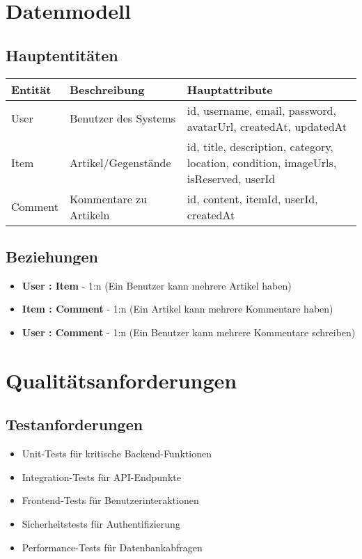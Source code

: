 \documentclass[a4paper,12pt]{article}
\begin{document}
\section{Datenmodell}

\subsection{Hauptentitäten}
\begin{longtable}{|p{}|p{}|p{}|}
\hline
\textbf{Entität} & \textbf{Beschreibung} & \textbf{Hauptattribute} \\
\hline
User & Benutzer des Systems & id, username, email, password, avatarUrl, createdAt, updatedAt \\
\hline
Item & Artikel/Gegenstände & id, title, description, category, location, condition, imageUrls, isReserved, userId \\
\hline
Comment & Kommentare zu Artikeln & id, content, itemId, userId, createdAt \\
\hline
\end{longtable}

\subsection{Beziehungen}
\begin{itemize}
    \item \textbf{User : Item} - 1:n (Ein Benutzer kann mehrere Artikel haben)
    \item \textbf{Item : Comment} - 1:n (Ein Artikel kann mehrere Kommentare haben)
    \item \textbf{User : Comment} - 1:n (Ein Benutzer kann mehrere Kommentare schreiben)
\end{itemize}

\section{Qualitätsanforderungen}

\subsection{Testanforderungen}
\begin{itemize}
    \item Unit-Tests für kritische Backend-Funktionen
    \item Integration-Tests für API-Endpunkte
    \item Frontend-Tests für Benutzerinteraktionen
    \item Sicherheitstests für Authentifizierung
    \item Performance-Tests für Datenbankabfragen
\end{itemize}
\end{document}
